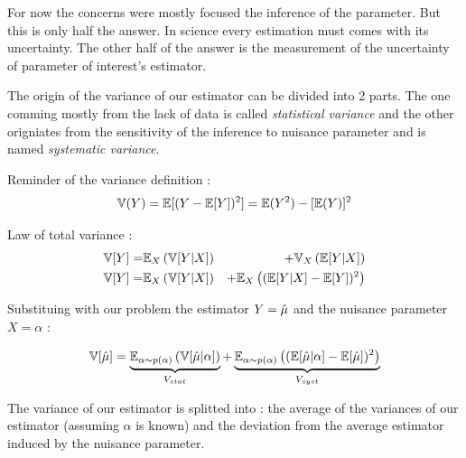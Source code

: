 
For now the concerns were mostly focused the inference of the parameter.
But this is only half the answer.
In science every estimation must comes with its uncertainty.
The other half of the answer is the measurement of the uncertainty of parameter of interest's estimator.

The origin of the variance of our estimator can be divided into 2 parts.
The one comming mostly from the lack of data is called \emph{statistical variance} and the other origniates from the sensitivity of the inference to nuisance parameter and is named \emph{systematic variance}.

Reminder of the variance definition :
\begin{equation}
	\mathbb{V}(Y) = \mathbb{E}[(Y - \mathbb{E}[Y])^2] = \mathbb{E}(Y^2) - [\mathbb{E}(Y)]^2
\end{equation}

Law of total variance \needcite :
\begin{eqnarray}
\label{eq:total_variance_law}
    \mathbb{V}[Y] =& \mathbb{E}_X \left (\mathbb{V}[Y|X] \right ) &+ \mathbb{V}_X \left (\mathbb{E}[Y|X]\right ) \\
    \mathbb{V}[Y] =& \mathbb{E}_X \left (\mathbb{V}[Y|X] \right ) &+ \mathbb{E}_X \left ( (\mathbb{E} [Y|X]  - \mathbb{E}[Y])^2\right )
\end{eqnarray}


Substituing with our problem the estimator $Y = \hat\mu$ and the nuisance parameter $X = \alpha$ :

\begin{equation}
\label{eq:stat_and_syst_variance_definition}
\mathbb{V}[\hat\mu] 
	= \underbrace{\mathbb{E}_{\alpha \sim p(\alpha)} \left (\mathbb{V}[\hat\mu | \alpha] \right )}_{V_{stat}} 
	+ \underbrace{\mathbb{E}_{\alpha \sim p(\alpha)} \left ( (\mathbb{E} [\hat\mu | \alpha]  - \mathbb{E}[\hat\mu])^2\right )}_{V_{syst}}
\end{equation}

The variance of our estimator is splitted into :
the average of the variances of our estimator (assuming $\alpha$ is known) and the deviation from the average estimator induced by the nuisance parameter.


